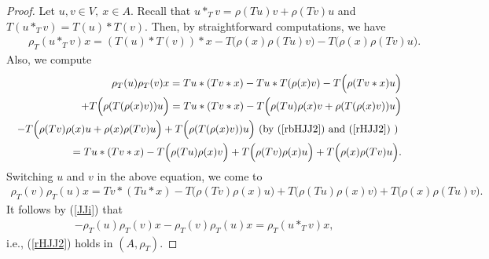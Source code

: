\documentclass[12pt]{amsart}
\begin{document}
	\begin{proof}
		Let $u,v\in V,\ x\in A.$ Recall that $u\ast_T v=\rho(Tu)v+\rho(Tv)u$ and $T(u\ast_T v)=T(u)\ast T(v).$ Then, by  straightforward  computations, we have
		\begin{eqnarray}
			&&\rho_T(u\ast_T v)x=(T(u)\ast T(v))\ast x-T\Big(\rho(x)\rho(Tu)v\Big)-T\Big(\rho(x)\rho(Tv)u\Big).\nonumber
		\end{eqnarray}
		Also, we compute
		\begin{eqnarray}
			&&\rho_T(u)\rho_T(v)x=Tu\ast(Tv\ast x)-Tu\ast T(\rho(x)v)-
			T\Big(\rho(Tv\ast x )u\Big)\nonumber\\
			&&+T\Big( \rho(T(\rho(x)v))u\Big)=
			Tu\ast(Tv\ast x)-T\Big(\rho(Tu)\rho(x)v+\rho(T(\rho(x)v))u \Big)\nonumber\\
			&&-
			T\Big(\rho(T v)\rho(x)u+\rho(x)\rho(Tv)u \Big)+T\Big( \rho(T(\rho(x)v))u\Big)
			\mbox{ (by (\ref{rbHJJ2}) and (\ref{rHJJ2})  ) }\nonumber\\
			&&=
			T u\ast(Tv\ast x)-T\Big(\rho(T u)\rho(x)v\Big)+
			T\Big(\rho(T v)\rho(x)u\Big)+T\Big(\rho(x)\rho(Tv)u \Big).\nonumber
		\end{eqnarray}
		Switching $u$ and $v$ in the above equation, we come to
		\begin{eqnarray}
			\rho_T(v)\rho_T(u)x=
			Tv\ast(Tu\ast x)-T\Big(\rho(T v)\rho(x)u\Big)+
			T\Big(\rho(T u)\rho(x)v\Big)+T\Big(\rho(x)\rho(Tu)v \Big).\nonumber
		\end{eqnarray}
		It follows by (\ref{JJi}) that
		\begin{eqnarray}
			-\rho_T(u)\rho_T(v)x-\rho_T(v)\rho_T(u)x=\rho_T(u\ast_T v)x,\nonumber
		\end{eqnarray}
		i.e., (\ref{rHJJ2}) holds in $(A,\rho_T).$
	\end{proof}
\end{document}
